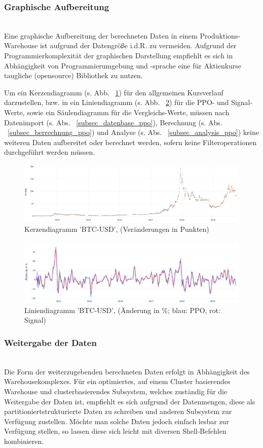 \subsubsection{Graphische Aufbereitung}~\\
Eine graphische Aufbereitung der berechneten Daten in einem Produktions-Warehouse ist aufgrund der Datengröße i.d.R. zu vermeiden. Aufgrund der Programmierkomplexität der graphischen Darstellung empfiehlt es sich in Abhängigkeit von Programmierumgebung und -sprache eine für Aktienkurse taugliche (opensource) Bibliothek zu nutzen. 

Um ein Kerzendiagramm (s. Abb. ~\ref{graph_btcusd_ppo_2}) für den allgemeinen Kursverlauf darzustellen, bzw. in ein Liniendiagramm (s. Abb. ~\ref{graph_btcusd_ppo_1}) für die PPO- und Signal-Werte, sowie ein Säulendiagramm für die Vergleichs-Werte, müssen nach Datenimport (s. Abs. ~\ref{subsec_datenbase_ppo}), Berechnung (s. Abs. ~\ref{subsec_berrechnung_ppo}) und Analyse (s. Abs. ~\ref{subsec_analysis_ppo}) keine weiteren Daten aufbereitet oder berechnet werden, sofern keine Filteroperationen durchgeführt werden müssen.

\begin{figure}[!htb]
\includegraphics[width=.5\textwidth,keepaspectratio]{ppo/graph_btcusd_ppo_2}
\caption{Kerzendiagramm 'BTC-USD', (Veränderungen in Punkten)}
\label{graph_btcusd_ppo_2}
\end{figure}

\begin{figure}[!htb]
\includegraphics[width=.5\textwidth,keepaspectratio]{ppo/graph_btcusd_ppo_1}
\caption{Liniendiagramm 'BTC-USD', (Änderung in \%; blau: PPO, rot: Signal)}
\label{graph_btcusd_ppo_1}
\end{figure}

\subsubsection{Weitergabe der Daten}~\\
Die Form der weiterzugebenden berechneten Daten erfolgt in Abhängigkeit des Warehousekomplexes. Für ein optimiertes, auf einem Cluster basierendes Warehouse und clusterbasierendes Subsystem, welches zuständig für die Weitergabe der Daten ist, empfiehlt es sich aufgrund der Datenmengen, diese als partitioniertstrukturierte Daten zu schreiben und anderen Subsystem zur Verfügung zustellen. Möchte man solche Daten jedoch einfach lesbar zur Verfügung stellen, so lassen diese sich leicht mit diversen Shell-Befehlen kombinieren.

